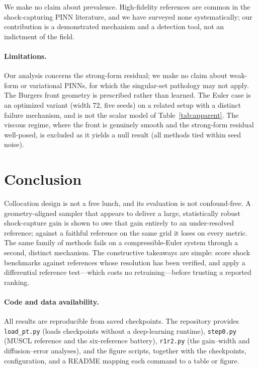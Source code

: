 \documentclass[11pt]{article}
\begin{document}
We make no claim about prevalence. High-fidelity references are common in the
shock-capturing PINN literature, and we have surveyed none systematically; our
contribution is a demonstrated mechanism and a detection tool, not an indictment
of the field.
\paragraph{Limitations.}
Our analysis concerns the strong-form residual; we make no claim about
weak-form or variational PINNs, for which the singular-set pathology may not
apply. The Burgers front geometry is prescribed rather than learned. The Euler
case is an optimized variant (width $72$, five seeds) on a related setup with a
distinct failure mechanism, and is not the scalar model of
Table~\ref{tab:apparent}. The viscous regime, where the front is genuinely smooth
and the strong-form residual well-posed, is excluded as it yields a null result
(all methods tied within seed noise).

\section{Conclusion}\label{sec:conclusion}
Collocation design is not a free lunch, and its evaluation is not confound-free.
A geometry-aligned sampler that appears to deliver a large, statistically robust
shock-capture gain is shown to owe that gain entirely to an under-resolved
reference; against a faithful reference on the same grid it loses on every metric.
The same family of methods fails on a compressible-Euler system through a second,
distinct mechanism. The constructive takeaways are simple: score shock benchmarks
against references whose resolution has been verified, and apply a differential
reference test---which costs no retraining---before trusting a reported ranking.

\paragraph{Code and data availability.}
All results are reproducible from saved checkpoints. The repository provides
\texttt{load\_pt.py} (loads checkpoints without a deep-learning runtime),
\texttt{step0.py} (MUSCL reference and the six-reference battery),
\texttt{r1r2.py} (the gain--width and diffusion--error analyses), and the figure
scripts, together with the checkpoints, configuration, and a README mapping each
command to a table or figure.
\end{document}
